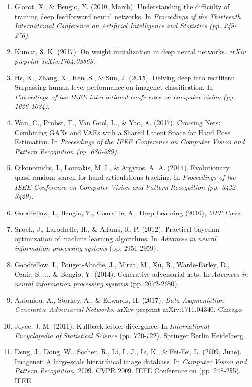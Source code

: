 \documentclass{article}
\begin{document}
\begin{enumerate}
\item Glorot, X., \& Bengio, Y. (2010, March). Understanding the difficulty of training deep feedforward neural networks. In \emph{ Proceedings of the Thirteenth International Conference on Artificial Intelligence and Statistics (pp. 249-256)}.
\item Kumar, S. K. (2017). On weight initialization in deep neural networks. \emph{arXiv preprint arXiv:1704.08863}.
\item He, K., Zhang, X., Ren, S., \& Sun, J. (2015). Delving deep into rectifiers: Surpassing human-level performance on imagenet classification. In \emph{Proceedings of the IEEE international conference on computer vision (pp. 1026-1034)}.
\item Wan, C., Probst, T., Van Gool, L., \& Yao, A. (2017). Crossing Nets: Combining GANs and VAEs with a Shared Latent Space for Hand Pose Estimation. In \emph{Proceedings of the IEEE Conference on Computer Vision and Pattern Recognition (pp. 680-689)}.
\item Oikonomidis, I., Lourakis, M. I., \& Argyros, A. A. (2014). Evolutionary quasi-random search for hand articulations tracking. In \emph{Proceedings of the IEEE Conference on Computer Vision and Pattern Recognition (pp. 3422-3429)}.
\item Goodfellow, I., Bengio, Y., Courville, A., Deep Learning (2016), \emph{MIT Press}.
\item Snoek, J., Larochelle, H., \& Adams, R. P. (2012). Practical bayesian optimization of machine learning algorithms. In \emph{Advances in neural information processing systems} (pp. 2951-2959).
\item Goodfellow, I., Pouget-Abadie, J., Mirza, M., Xu, B., Warde-Farley, D., Ozair, S., ... \& Bengio, Y. (2014). Generative adversarial nets. In \emph{Advances in neural information processing systems} (pp. 2672-2680).
\item Antoniou, A., Storkey, A., \& Edwards, H. (2017). \emph{Data Augmentation Generative Adversarial Networks}. arXiv preprint arXiv:1711.04340.
Chicago	
\item Joyce, J. M. (2011). Kullback-leibler divergence. In \emph{International Encyclopedia of Statistical Science} (pp. 720-722). Springer Berlin Heidelberg.
\item Deng, J., Dong, W., Socher, R., Li, L. J., Li, K., \& Fei-Fei, L. (2009, June). Imagenet: A large-scale hierarchical image database. In \emph{Computer Vision and Pattern Recognition}, 2009. CVPR 2009. IEEE Conference on (pp. 248-255). IEEE.

\end{enumerate}
\end{document}
